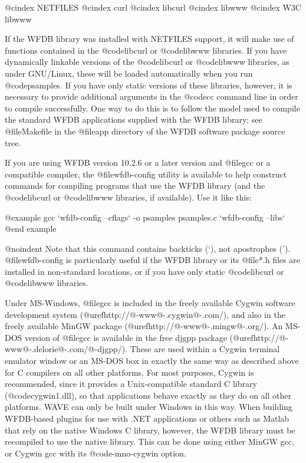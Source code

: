 {@cindex NETFILES
@cindex curl
@cindex libcurl
@cindex libwww
@cindex W3C libwww

If the WFDB library was installed with NETFILES support, it will make use of
functions contained in the @code{libcurl} or @code{libwww} libraries.  If you
have dynamically linkable versions of the @code{libcurl} or @code{libwww}
libraries, as under GNU/Linux, these will be loaded automatically when you run
@code{psamples}.  If you have only static versions of these libraries, however,
it is necessary to provide additional arguments in the @code{cc} command line
in order to compile successfully.  One way to do this is to follow the model
used to compile the standard WFDB applications supplied with the WFDB library;
see @file{Makefile} in the @file{app} directory of the WFDB software package
source tree.

If you are using WFDB version 10.2.6 or a later version and @file{gcc}
or a compatible compiler, the @file{wfdb-config} utility is available
to help construct commands for compiling programs that use the WFDB
library (and the @code{libcurl} or @code{libwww} libraries, if available).
Use it like this:

@example
gcc `wfdb-config --cflags` -o psamples psamples.c `wfdb-config --libs`
@end example

@noindent
Note that this command contains backticks (`), not apostrophes (').
@file{wfdb-config} is particularly useful if the WFDB library or
its @file{*.h} files are installed in non-standard locations, or if
you have only static @code{libcurl} or @code{libwww} libraries.

Under MS-Windows, @file{gcc} is included in the freely available Cygwin
software development system (@uref{http://@-www@-.cygwin@-.com/}), and also in
the freely available MinGW package (@uref{http://@-www@-.mingw@-.org/}).  An
MS-DOS version of @file{gcc} is available in the free djgpp package
(@uref{http://@-www@-.delorie@-.com/@-djgpp/}). These are used within a Cygwin
terminal emulator window or an MS-DOS box in exactly the same way as described
above for C compilers on all other platforms.  For most purposes, Cygwin is
recommended, since it provides a Unix-compatible standard C library
(@code{cygwin1.dll}), so that applications behave exactly as they do on all
other platforms.  WAVE can only be built under Windows in this way.  When
building WFDB-based plugins for use with .NET applications or others such as
Matlab that rely on the native Windows C library, however, the WFDB library
must be recompiled to use the native library.  This can be done using either
MinGW gcc, or Cygwin gcc with its @code{-mno-cygwin} option.

}
